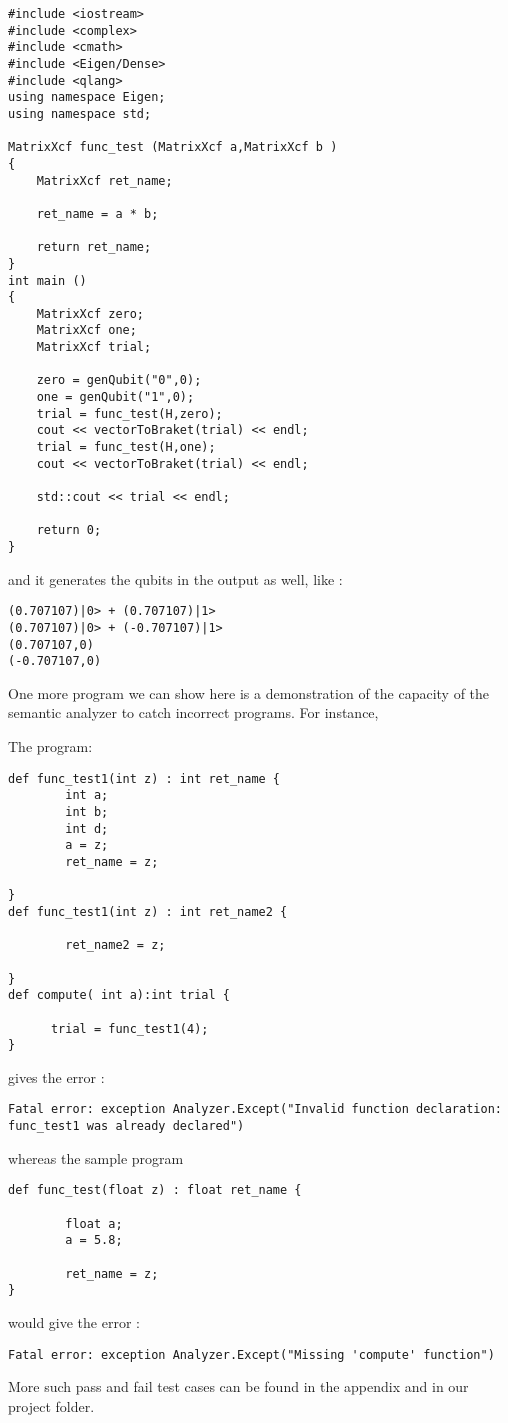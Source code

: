 \begin{verbatim}
#include <iostream>
#include <complex>
#include <cmath>
#include <Eigen/Dense>
#include <qlang>
using namespace Eigen;
using namespace std;
        
MatrixXcf func_test (MatrixXcf a,MatrixXcf b )
{
	MatrixXcf ret_name;
 
	ret_name = a * b;

	return ret_name;
}
int main ()
{
	MatrixXcf zero;
	MatrixXcf one;
	MatrixXcf trial;
 
	zero = genQubit("0",0);
	one = genQubit("1",0);
	trial = func_test(H,zero);
	cout << vectorToBraket(trial) << endl;
	trial = func_test(H,one);
	cout << vectorToBraket(trial) << endl;

	std::cout << trial << endl;

	return 0;
}
\end{verbatim}

and it generates the qubits in the output as well, like :

\begin{verbatim}
(0.707107)|0> + (0.707107)|1>
(0.707107)|0> + (-0.707107)|1>
(0.707107,0)
(-0.707107,0)
\end{verbatim}

One more program we can show here is a demonstration of the capacity of the semantic analyzer to catch incorrect programs. For instance,

The program:

\begin{verbatim}
def func_test1(int z) : int ret_name { 
        int a;
        int b;
        int d;
        a = z;
        ret_name = z;

}
def func_test1(int z) : int ret_name2 { 

        ret_name2 = z;

}
def compute( int a):int trial {
      
      trial = func_test1(4);
}

\end{verbatim}


gives the error :
\begin{verbatim}
Fatal error: exception Analyzer.Except("Invalid function declaration: func_test1 was already declared")
\end{verbatim}


whereas the sample program

\begin{verbatim}
def func_test(float z) : float ret_name { 
        
        float a; 
        a = 5.8;
       
        ret_name = z;  
}
\end{verbatim}


would give the error :
\begin{verbatim}
Fatal error: exception Analyzer.Except("Missing 'compute' function")
\end{verbatim}

More such pass and fail test cases can be found in the appendix and in our project folder.






